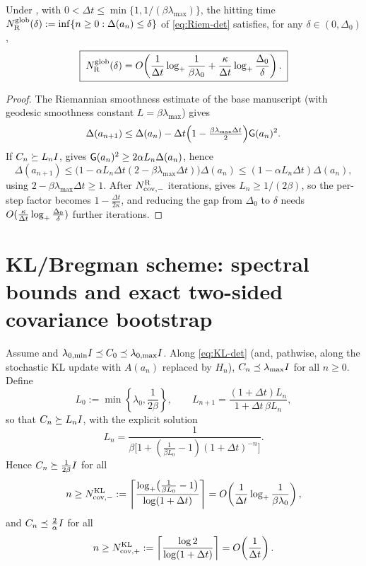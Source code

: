 \begin{theorem}
\label{thm:Riem-global}
Under , with
$0<\Delta t\leq\min\{1,1/(\beta\lambda_{\max})\}$, the hitting time
$N_{\mathrm{R}}^{\mathrm{glob}}(\delta):=\inf\{n\geq0:\Delta(a_n)\leq\delta\}$ of \eqref{eq:Riem-det}
satisfies, for any $\delta\in(0,\Delta_0)$,
\[
    \boxed{\;
    N_{\mathrm{R}}^{\mathrm{glob}}(\delta)
    =
    O\!\left(
        \frac1{\Delta t}\log_+\frac1{\beta\lambda_0}
        +
        \frac\kappa{\Delta t}\log_+\frac{\Delta_0}{\delta}
    \right).
    \;}
\]
\end{theorem}

\begin{proof}
The Riemannian smoothness estimate of the base manuscript (with geodesic smoothness
constant $L=\beta\lambda_{\max}$) gives
\[
    \Delta(a_{n+1})
    \leq
    \Delta(a_n)
    -
    \Delta t\Bigl(1-\tfrac{\beta\lambda_{\max}\Delta t}{2}\Bigr)\mathsf{G}(a_n)^2 .
\]
If $C_n\succeq L_nI$,  gives $\mathsf{G}(a_n)^2\geq2\alpha L_n\Delta(a_n)$, hence
\[
    \Delta(a_{n+1})
    \leq
    \bigl(1-\alpha L_n\Delta t(2-\beta\lambda_{\max}\Delta t)\bigr)\Delta(a_n)
    \leq
    (1-\alpha L_n\Delta t)\Delta(a_n),
\]
using $2-\beta\lambda_{\max}\Delta t\geq1$. After $N_{\mathrm{cov},-}^{\mathrm{R}}$ iterations,
 gives $L_n\geq1/(2\beta)$, so the per-step factor becomes
$1-\tfrac{\Delta t}{2\kappa}$, and reducing the gap from $\Delta_0$ to $\delta$ needs
$O(\tfrac\kappa{\Delta t}\log_+\tfrac{\Delta_0}{\delta})$ further iterations.
\end{proof}

\section{KL/Bregman scheme: spectral bounds and exact two-sided covariance bootstrap}

\begin{lemma}
\label{lem:KL-cov}
Assume  and $\lambda_{0,\min}I\preceq C_0\preceq\lambda_{0,\max}I$.
Along \eqref{eq:KL-det} (and, pathwise, along the stochastic KL update with $A(a_n)$
replaced by $H_n$), $C_n\preceq\lambda_{\max}I$ for all $n\geq0$. Define
\[
    L_0:=\min\left\{\lambda_0,\frac1{2\beta}\right\},
    \qquad
    L_{n+1}=\frac{(1+\Delta t)L_n}{1+\Delta t\,\beta L_n},
\]
so that $C_n\succeq L_nI$, with the explicit solution
\[
    L_n
    =
    \frac1{\beta\bigl[1+(\tfrac1{\beta L_0}-1)(1+\Delta t)^{-n}\bigr]} .
\]
Hence $C_n\succeq\tfrac1{2\beta}I$ for all
\[
    n\geq
    N_{\mathrm{cov},-}^{\mathrm{KL}}
    :=
    \left\lceil
        \frac{\log_+\bigl(\tfrac1{\beta L_0}-1\bigr)}{\log(1+\Delta t)}
    \right\rceil
    =
    O\!\left(\frac1{\Delta t}\log_+\frac1{\beta\lambda_0}\right),
\]
and $C_n\preceq\tfrac2\alpha I$ for all
\[
    n\geq
    N_{\mathrm{cov},+}^{\mathrm{KL}}
    :=
    \left\lceil\frac{\log2}{\log(1+\Delta t)}\right\rceil
    =
    O\!\left(\frac1{\Delta t}\right).
\]
\end{lemma}

